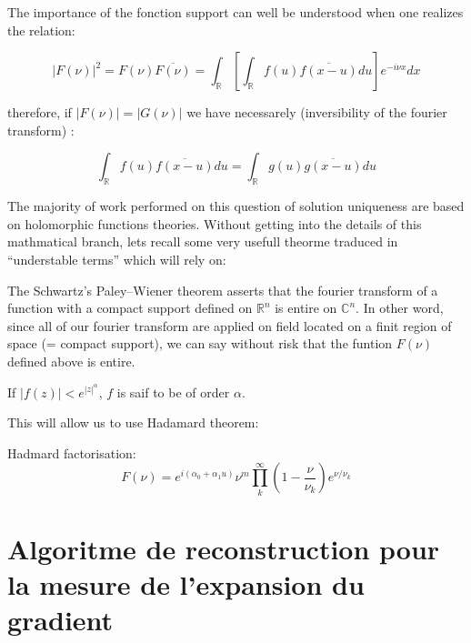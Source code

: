The importance of the fonction support can well be understood when one realizes the relation:

\begin{equation}
|F(\nu)|^2 = F(\nu)\overline{F(\nu)} = \int_{\mathbb{R}}[\int_{\mathbb{R}} f(u)\overline{f(x-u)}du]e^{-i\nu x}dx
\end{equation}

therefore, if $|F(\nu)| = |G(\nu)|$ we have necessarely (inversibility of the fourier transform) :

\begin{equation}
\int_{\mathbb{R}} f(u)\overline{f(x-u)}du= \int_{\mathbb{R}} g(u)\overline{g(x-u)}du
\end{equation}


The majority of work performed on this question of solution uniqueness are based on holomorphic functions theories. Without getting into the details of this mathmatical branch, lets recall some very usefull theorme traduced in ``understable terms'' which will rely on:

The Schwartz's Paley–Wiener theorem asserts that the fourier transform of a function with a compact support defined on $\mathbb{R}^n$ is entire on $\mathbb{C}^n$. In other word, since all of our fourier transform are applied on field located on a finit region of space (= compact support), we can say without risk that the funtion $F(\nu)$ defined above is entire. 

If $|f(z)|<e^{|z|^{\alpha}}$, $f$ is saif to be of order $\alpha$.

This will allow us to use Hadamard theorem:

Hadmard factorisation:
\begin{equation}
F(\nu) = e^{i(\alpha_0+\alpha_1 u)}\nu^m\prod_{k}^{\infty}(1 - \frac{\nu}{\nu_k})e^{\nu/\nu_k}
\end{equation}






\section{Algoritme de reconstruction pour la mesure de l'expansion du gradient}

